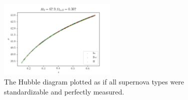 \documentclass[12pt, onecolumn]{emulateapj}
\newcommand{\textul}{\underline}
\begin{document}
\begin{figure}
	\begin{center}
		\includegraphics[width=0.5\textwidth]{fig/true_hubble.png}
		\caption{The Hubble diagram plotted as if all supernova types were standardizable and perfectly measured.}
		\label{fig:true_hubble}
	\end{center}
\end{figure}
%
%
%
\end{document}
